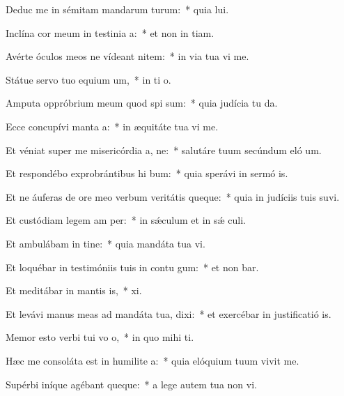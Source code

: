 \item Deduc me in sémitam mandarum turum:~* quia  lui.
\item Inclína cor meum in testinia a:~* et non in tiam.
\item Avérte óculos meos ne vídeant nitem:~* in via tua vi me.
\item Státue servo tuo equium um,~* in ti o.
\item Amputa oppróbrium meum quod spi sum:~* quia judícia tu da.
\item Ecce concupívi manta a:~* in æquitáte tua vi me.
\item Et véniat super me misericórdia a, ne:~* salutáre tuum secúndum eló um.
\item Et respondébo exprobrántibus hi bum:~* quia sperávi in sermó is.
\item Et ne áuferas de ore meo verbum veritátis queque:~* quia in judíciis tuis suvi.
\item Et custódiam legem am per:~* in sǽculum et in sǽ culi.
\item Et ambulábam in tine:~* quia mandáta tua vi.
\item Et loquébar in testimóniis tuis in contu gum:~* et non bar.
\item Et meditábar in mantis is,~*  xi.
\item Et levávi manus meas ad mandáta tua,  dixi:~* et exercébar in justificatió is.
\item Memor esto verbi tui vo o,~* in quo mihi  ti.
\item Hæc me consoláta est in humilite a:~* quia elóquium tuum vivit me.
\item Supérbi iníque agébant queque:~* a lege autem tua non vi.
